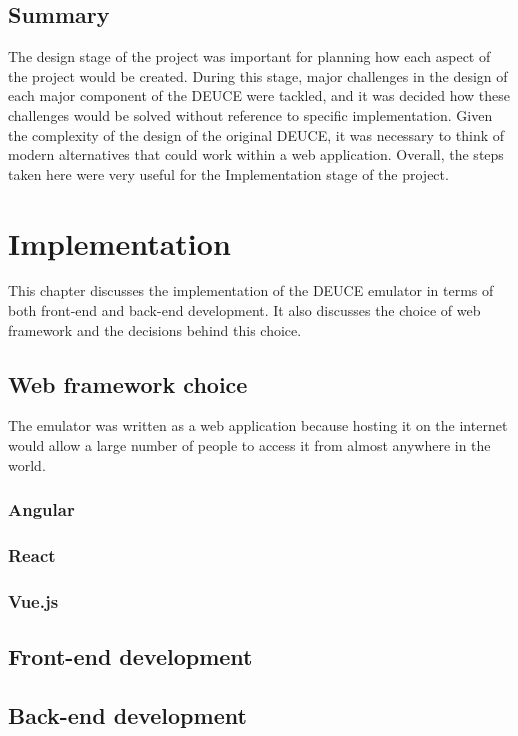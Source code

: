 \documentclass{l4proj}
\begin{document}
\section{Summary}
The design stage of the project was important for planning how each aspect of the project would be created. During this stage, major challenges in the design of each major component of the DEUCE were tackled, and it was decided how these challenges would be solved without reference to specific implementation. Given the complexity of the design of the original DEUCE, it was necessary to think of modern alternatives that could work within a web application. Overall, the steps taken here were very useful for the Implementation stage of the project.

\chapter{Implementation}
This chapter discusses the implementation of the DEUCE emulator in terms of both front-end and back-end development. It also discusses the choice of web framework and the decisions behind this choice. 

\section{Web framework choice}
The emulator was written as a web application because hosting it on the internet would allow a large number of people to access it from almost anywhere in the world.
\subsection{Angular}
\subsection{React}
\subsection{Vue.js}
\section{Front-end development}
\section{Back-end development}
\end{document}
